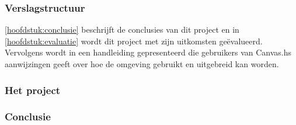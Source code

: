 \subsubsection{Verslagstructuur}
  \autoref{hoofdstuk:conclusie} beschrijft de conclusies van dit project en in \autoref{hoofdstuk:evaluatie} wordt dit project met zijn uitkomsten geëvalueerd. Vervolgens wordt in  een handleiding gepresenteerd die gebruikers van Canvas.hs aanwijzingen geeft over hoe de omgeving gebruikt en uitgebreid kan worden.

\subsubsection{Het project}

\subsubsection{Conclusie}






